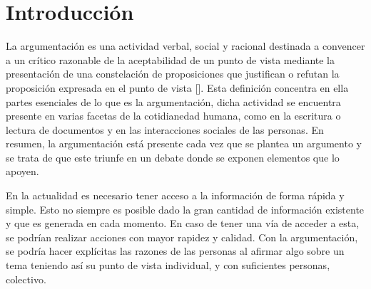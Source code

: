 \chapter*{Introducción}\label{chapter:introduction}



La argumentación es una actividad verbal, social y racional destinada a convencer 
a un crítico razonable de la aceptabilidad de un punto de vista mediante la presentación 
de una constelación de proposiciones que justifican o refutan la proposición expresada 
en el punto de vista [\cite{van2004systematic}]. Esta definición concentra en ella 
partes esenciales de lo que es la argumentación, dicha actividad se encuentra presente
en varias facetas de la cotidianedad humana, como en la escritura o lectura de documentos y
en las interacciones sociales de las personas. En resumen, la argumentación está presente 
cada vez que se plantea un argumento y se trata de que este triunfe en un debate donde 
se exponen elementos que lo apoyen.   

En la actualidad es necesario tener acceso a la información
de forma rápida y simple. Esto no siempre es posible dado la gran cantidad de información existente y
que es generada en cada momento. En caso de tener una vía de acceder a esta, se podrían realizar acciones
con mayor rapidez y calidad. Con la argumentación, se podría hacer explícitas las razones de las personas 
al afirmar algo sobre un tema teniendo así su punto de vista individual, y con suficientes personas, colectivo.


